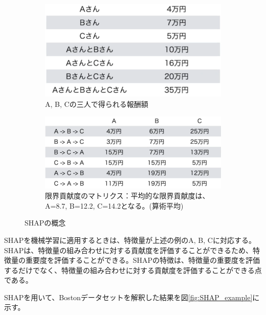 \documentclass{ltjsarticle}
\begin{document}
\begin{figure}[htbp]
  \centering
  \begin{subfigure}[b]{0.45\textwidth}
    \centering
    \includegraphics[width=\textwidth]{./capture/SHAP_ABC_price.png}
    \caption{A, B, Cの三人で得られる報酬額}
    \label{fig:SHAP_ABC_price}
  \end{subfigure}
  \hfill
  \begin{subfigure}[b]{0.45\textwidth}
    \centering
    \includegraphics[width=\textwidth]{./capture/SHAP_ABC_dedication.png}
    \caption{限界貢献度のマトリクス：平均的な限界貢献度は、A=8.7, B=12.2, C=14.2となる。(算術平均)}
    \label{fig:SHAP_ABC_dedication}
  \end{subfigure}
  \caption{SHAPの概念}
\end{figure}
\par
SHAPを機械学習に適用するときは、特徴量が上述の例のA, B, Cに対応する。SHAPは、特徴量の組み合わせに対する貢献度を評価することができるため、特徴量の重要度を評価することができる。SHAPの特徴は、特徴量の重要度を評価するだけでなく、特徴量の組み合わせに対する貢献度を評価することができる点である。
\par
SHAPを用いて、Bostonデータセットを解釈した結果を図\ref{fig:SHAP_example}に示す。
\end{document}
